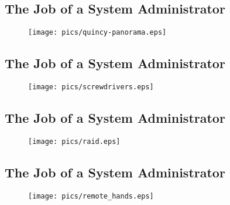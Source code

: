 \documentclass[xga]{xdvislides}
\begin{document}
\subsection{The Job of a System Administrator}
\vspace*{\fill}
\begin{figure}[hb]
	\begin{center}
		\texttt{[image: pics/quincy-panorama.eps]} \\
	\end{center}
\end{figure}
\vspace*{\fill}

\subsection{The Job of a System Administrator}
\vspace*{\fill}
\begin{figure}[hb]
	\begin{center}
		\texttt{[image: pics/screwdrivers.eps]} \\
	\end{center}
\end{figure}
\vspace*{\fill}

\subsection{The Job of a System Administrator}
\vspace*{\fill}
\begin{figure}[hb]
	\begin{center}
		\texttt{[image: pics/raid.eps]} \\
	\end{center}
\end{figure}
\vspace*{\fill}

\subsection{The Job of a System Administrator}
\vspace*{\fill}
\begin{figure}[hb]
	\begin{center}
		\texttt{[image: pics/remote\_hands.eps]} \\
	\end{center}
\end{figure}
\vspace*{\fill}
\end{document}
